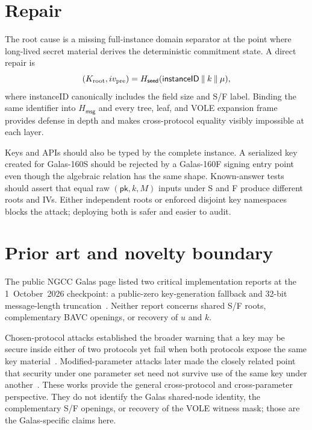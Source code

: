 \documentclass[11pt,a4paper]{article}
\newcommand{\pk}{\mathsf{pk}}
\newcommand{\Hmsg}{H_{\mathsf{msg}}}
\newcommand{\Hseed}{H_{\mathsf{seed}}}
\begin{document}
\section{Repair}

The root cause is a missing full-instance domain separator at the point where
long-lived secret material derives the deterministic commitment state.  A direct
repair is
\begin{equation}
 (K_{\rm root},iv_{\rm pre})=
 \Hseed(\mathsf{instanceID}\mathbin\|k\mathbin\|\mu),   \label{eq:repair}
\end{equation}
where \textsf{instanceID} canonically includes the field size and S/F label.
Binding the same identifier into $\Hmsg$ and every tree, leaf, and VOLE expansion
frame provides defense in depth and makes cross-protocol equality visibly
impossible at each layer.

Keys and APIs should also be typed by the complete instance.  A serialized key
created for Galas-160S should be rejected by a Galas-160F signing entry point even
though the algebraic relation has the same shape.  Known-answer tests should
assert that equal raw $(\pk,k,M)$ inputs under S and F produce different roots and
IVs.  Either independent roots or enforced disjoint key namespaces blocks the
attack; deploying both is safer and easier to audit.

\section{Prior art and novelty boundary}

The public NGCC Galas page listed two critical implementation reports at the
1~October~2026 checkpoint: a public-zero key-generation fallback and 32-bit
message-length truncation~\cite{ngcc-galas}.  Neither report concerns shared
S/F roots, complementary BAVC openings, or recovery of $u$ and $k$.

Chosen-protocol attacks established the broader warning that a key may be secure
inside either of two protocols yet fail when both protocols expose the same key
material~\cite{kelsey1998}.  Modified-parameter attacks later made the closely
related point that security under one parameter set need not survive use of the
same key under another~\cite{howgrave2004}.  These works provide the general
cross-protocol and cross-parameter perspective.  They do not identify the Galas
shared-node identity, the complementary S/F openings, or recovery of the VOLE
witness mask; those are the Galas-specific claims here.
\end{document}
